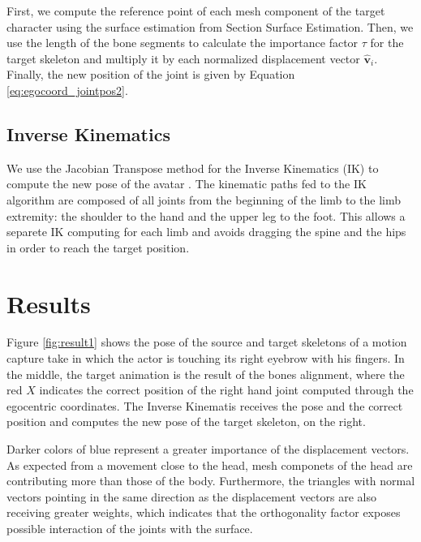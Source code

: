 \documentclass{vgtc}
\begin{document}
First, we compute the reference point of each mesh component of the
target character using the surface estimation from Section Surface
Estimation. Then, we use the length of the bone segments to calculate
the importance factor \(\tau\) for the target skeleton and multiply it
by each normalized displacement vector \(\mathbf{\hat{v}}_{i}\).
Finally, the new position of the joint is given by Equation
\ref{eq:egocoord_jointpos2}.

\subsection{Inverse Kinematics}\label{inverse-kinematics}

We use the Jacobian Transpose method for the Inverse Kinematics (IK) to
compute the new pose of the avatar \cite{buss}. The kinematic paths fed
to the IK algorithm are composed of all joints from the beginning of the
limb to the limb extremity: the shoulder to the hand and the upper leg
to the foot. This allows a separete IK computing for each limb and
avoids dragging the spine and the hips in order to reach the target
position.


    \section{Results}\label{results}

Figure \ref{fig:result1} shows the pose of the source and target
skeletons of a motion capture take in which the actor is touching its
right eyebrow with his fingers. In the middle, the target animation is
the result of the bones alignment, where the red \(X\) indicates the
correct position of the right hand joint computed through the egocentric
coordinates. The Inverse Kinematis receives the pose and the correct
position and computes the new pose of the target skeleton, on the right.

Darker colors of blue represent a greater importance of the displacement
vectors. As expected from a movement close to the head, mesh componets
of the head are contributing more than those of the body. Furthermore,
the triangles with normal vectors pointing in the same direction as the
displacement vectors are also receiving greater weights, which indicates
that the orthogonality factor exposes possible interaction of the joints
with the surface.


    \captionsetup{labelformat=default}
    \begin{figure}
        \begin{center}\end{center}
        \caption{}
        \label{}
    \end{figure}
\end{document}
